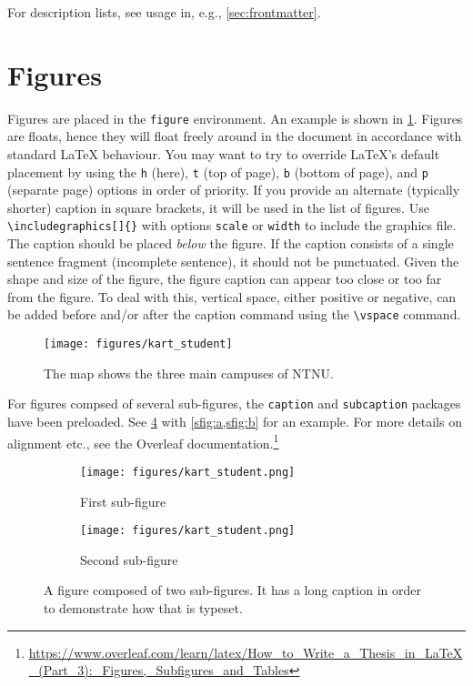 For description lists, see usage in, e.g., \cref{sec:frontmatter}.

\section{Figures}

Figures are placed in the \texttt{figure} environment. An example is shown in \cref{fig:mapNTNU}. Figures are floats, hence they will float freely around in the document in accordance with standard \LaTeX{} behaviour. You may want to try to override \LaTeX{}'s default placement by using the \texttt{h} (here), \texttt{t} (top of page), \texttt{b} (bottom of page), and \texttt{p} (separate page) options in order of priority. If you provide an alternate (typically shorter) caption in square brackets, it will be used in the list of figures. Use \texttt{\textbackslash includegraphics[]\{\}} with options \texttt{scale} or \texttt{width} to include the graphics file. The caption should be placed \emph{below} the figure. If the caption consists of a single sentence fragment (incomplete sentence), it should not be punctuated. Given the shape and size of the figure, the figure caption can appear too close or too far from the figure. To deal with this, vertical space, either positive or negative, can be added before and/or after the caption command using the \texttt{\textbackslash vspace{}} command.

\begin{figure}[htbp]  %
  \centering
  \texttt{[image: figures/kart\_student]}
  \caption[Map of NTNU Campuses]{The map shows the three main campuses of NTNU.}
  \label{fig:mapNTNU}
\end{figure}

For figures compsed of several sub-figures, the \texttt{caption} and \texttt{subcaption} packages have been preloaded. See \cref{fig:subfig} with \cref{sfig:a,sfig:b} for an example. For more details on alignment etc., see the Overleaf documentation.\footnote{\url{https://www.overleaf.com/learn/latex/How_to_Write_a_Thesis_in_LaTeX_(Part_3):_Figures,_Subfigures_and_Tables}}

\begin{figure}
    \centering
    \begin{subfigure}[b]{.45\textwidth}
        \centering
        \texttt{[image: figures/kart\_student.png]}
        \caption{First sub-figure}
        \label{sfig:a}
    \end{subfigure}
    \hfill
    \begin{subfigure}[b]{.45\textwidth}
        \centering
        \texttt{[image: figures/kart\_student.png]}
        \caption{Second sub-figure}
        \label{sfig:b}
    \end{subfigure}
    \caption{A figure composed of two sub-figures. It has a long caption in order to demonstrate how that is typeset.}
    \label{fig:subfig}
\end{figure}

